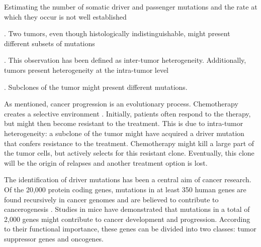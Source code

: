       Estimating the number of somatic driver and passenger mutations and the
      rate at which they occur is not well established {\cite{driver_passenger}.
      Two tumors, even though histologically indistinguishable, might present
      different subsets of mutations {\cite{driver_passenger}
      {\cite{intertumor}}. This observation has been defined as inter-tumor
      heterogeneity. Additionally, tumors present heterogeneity at the
      intra-tumor level {\cite{intratumor}. Subclones of the tumor might present
      different mutations.

      As mentioned, cancer progression is an evolutionary process. Chemotherapy
      creates a selective environment {\cite{selective_chemo}}. Initially,
      patients often respond to the therapy, but might then become resistant to
      the treatment. This is due to intra-tumor heterogeneity: a subclone of the
      tumor might have acquired a driver mutation that confers resistance to the
      treatment. Chemotherapy might kill a large part of the tumor cells, but
      actively selects for this resistant clone. Eventually, this clone will be
      the origin of relapses and another treatment option is lost.

      The identification of driver mutations has been a central aim of cancer
      research. Of the 20,000 protein coding genes, mutations in at least 350
      human genes are found recursively in cancer genomes and are believed to
      contribute to cancerogenesis {\cite{cancer_genome}}. Studies in mice have
      demonstrated that mutations in a total of 2,000 genes might contribute to
      cancer development and progression. According to their functional
      importance, these genes can be divided into two classes: tumor suppressor
      genes and oncogenes.

}}}
